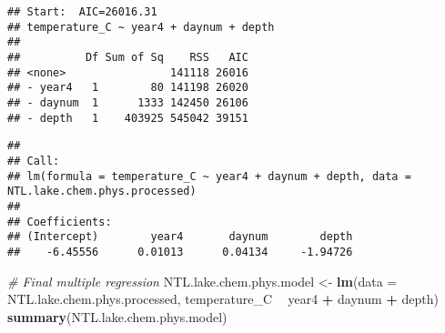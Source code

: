 \documentclass[]{article}
\newenvironment{Shaded}{\begin{snugshade}}{\end{snugshade}}
\newcommand{\KeywordTok}[1]{\textcolor[rgb]{0.13,0.29,0.53}{\textbf{#1}}}
\newcommand{\DataTypeTok}[1]{\textcolor[rgb]{0.13,0.29,0.53}{#1}}
\newcommand{\DecValTok}[1]{\textcolor[rgb]{0.00,0.00,0.81}{#1}}
\newcommand{\StringTok}[1]{\textcolor[rgb]{0.31,0.60,0.02}{#1}}
\newcommand{\CommentTok}[1]{\textcolor[rgb]{0.56,0.35,0.01}{\textit{#1}}}
\newcommand{\OperatorTok}[1]{\textcolor[rgb]{0.81,0.36,0.00}{\textbf{#1}}}
\newcommand{\NormalTok}[1]{#1}
\begin{document}
\begin{Shaded}
\end{Shaded}

\begin{verbatim}
## Start:  AIC=26016.31
## temperature_C ~ year4 + daynum + depth
## 
##          Df Sum of Sq    RSS   AIC
## <none>                141118 26016
## - year4   1        80 141198 26020
## - daynum  1      1333 142450 26106
## - depth   1    403925 545042 39151
\end{verbatim}

\begin{verbatim}
## 
## Call:
## lm(formula = temperature_C ~ year4 + daynum + depth, data = NTL.lake.chem.phys.processed)
## 
## Coefficients:
## (Intercept)        year4       daynum        depth  
##    -6.45556      0.01013      0.04134     -1.94726
\end{verbatim}

\begin{Shaded}
\begin{Highlighting}[]
\CommentTok{# Final multiple regression}
\NormalTok{NTL.lake.chem.phys.model <-}\StringTok{ }
\StringTok{  }\KeywordTok{lm}\NormalTok{(}\DataTypeTok{data =}\NormalTok{ NTL.lake.chem.phys.processed, temperature_C }\OperatorTok{~}\StringTok{ }\NormalTok{year4 }\OperatorTok{+}\StringTok{ }\NormalTok{daynum }\OperatorTok{+}\StringTok{ }\NormalTok{depth)}
\KeywordTok{summary}\NormalTok{(NTL.lake.chem.phys.model)}
\end{Highlighting}
\end{Shaded}
\end{document}
